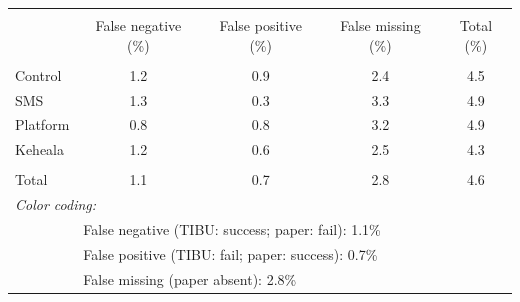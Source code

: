 \scriptsize{
\begin{tabular}{lcccc}
\hline \hline \\[-8pt]
\rowcolor{yellow!15} & \cellcolor{red!20} False negative (\%)& \cellcolor{green!20} False positive (\%)& \cellcolor{blue!20} False missing (\%)& Total (\%) \\
\hline \\[-8pt]
Control & \cellcolor{red!20}1.2 & \cellcolor{green!20}0.9 & \cellcolor{blue!20}2.4 & 4.5 \\
SMS & \cellcolor{red!20}1.3 & \cellcolor{green!20}0.3 & \cellcolor{blue!20}3.3 & 4.9 \\
Platform & \cellcolor{red!20}0.8 & \cellcolor{green!20}0.8 & \cellcolor{blue!20}3.2 & 4.9 \\
Keheala & \cellcolor{red!20}1.2 & \cellcolor{green!20}0.6 & \cellcolor{blue!20}2.5 & 4.3 \\
\hline \\[-8pt]
Total & \cellcolor{red!20}1.1 & \cellcolor{green!20}0.7 & \cellcolor{blue!20}2.8 & 4.6 \\
\hline \hline
\multicolumn{5}{l}{\scriptsize{\textit{Color coding:}}} \\[-4pt]
\cellcolor{red!20} & \multicolumn{4}{l}{\scriptsize{False negative (TIBU: success; paper: fail): 1.1\%}} \\[-4pt]
\cellcolor{green!20} & \multicolumn{4}{l}{\scriptsize{False positive (TIBU: fail; paper: success): 0.7\%}} \\[-4pt]
\cellcolor{blue!20} & \multicolumn{4}{l}{\scriptsize{False missing (paper absent): 2.8\%}} \\
\end{tabular}}
